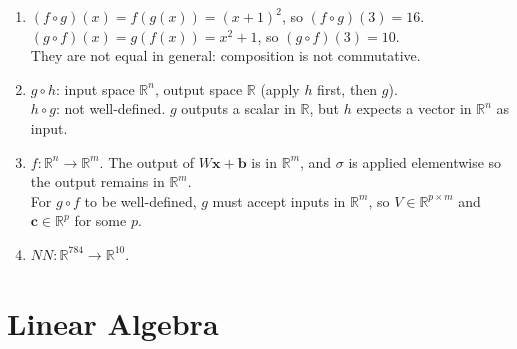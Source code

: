 \documentclass[12pt, a4paper]{scrartcl}
\begin{document}
\begin{enumerate}
\item $(f \circ g)(x) = f(g(x)) = (x+1)^2$, so $(f \circ g)(3) = 16$.\\
$(g \circ f)(x) = g(f(x)) = x^2 + 1$, so $(g \circ f)(3) = 10$.\\
They are not equal in general: composition is not commutative.

\item $g \circ h$: input space $\mathbb{R}^n$, output space $\mathbb{R}$ (apply $h$ first, then $g$).\\
$h \circ g$: not well-defined. $g$ outputs a scalar in $\mathbb{R}$, but $h$ expects a vector in $\mathbb{R}^n$ as input.

\item $f: \mathbb{R}^n \to \mathbb{R}^m$. The output of $W\mathbf{x} + \mathbf{b}$ is in $\mathbb{R}^m$, and $\sigma$ is applied elementwise so the output remains in $\mathbb{R}^m$.\\
For $g \circ f$ to be well-defined, $g$ must accept inputs in $\mathbb{R}^m$, so $V \in \mathbb{R}^{p \times m}$ and $\mathbf{c} \in \mathbb{R}^p$ for some $p$.

\item $NN: \mathbb{R}^{784} \to \mathbb{R}^{10}$.

\end{enumerate}

\section{Linear Algebra}
\end{document}
